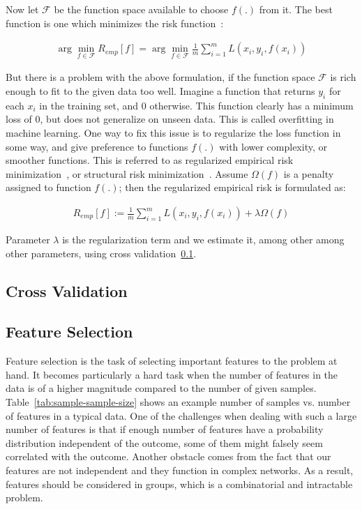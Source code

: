 Now let $\mathcal{F}$ be the function space available to choose $f(.)$ from it. The best function is one which minimizes the risk function~\cite[p. 67]{learning-with-kernels}:

\begin{align}
  \arg \min_{f \in \mathcal{F}} R_{emp}[f] = \arg \min_{f \in \mathcal{F}} \frac{1}{m}\sum_{i = 1}^{m} L(x_i, y_i, f(x_i))
\end{align}

But there is a problem with the above formulation, if the function space $\mathcal{F}$ is rich enough to fit to the given data too well. Imagine a function that returns $y_i$ for each $x_i$ in the training set, and $0$ otherwise. This function clearly has a minimum loss of $0$, but does not generalize on unseen data. This is called overfitting in machine learning. One way to fix this issue is to regularize the loss function in some way, and give preference to functions $f(.)$ with lower complexity, or smoother functions. This is referred to as regularized empirical risk minimization~\cite[Ch. 4.1]{learning-with-kernels}, or structural risk minimization~\cite[Ch. 4.1]{thenatureofstatisticallearningtheory}. Assume $\Omega(f)$ is a penalty assigned to function $f(.)$; then the regularized empirical risk is formulated as:

\begin{align}
  R_{emp}[f] := \frac{1}{m}\sum_{i = 1}^{m} L(x_i, y_i, f(x_i)) + \lambda \Omega(f)
\end{align}

Parameter $\lambda$ is the regularization term and we estimate it, among other among other parameters, using cross validation~\ref{chap:cross-validation}.

\subsection{Cross Validation}
\label{chap:cross-validation}


  
\subsection{Feature Selection}
Feature selection is the task of selecting important features to the problem at hand. It becomes particularly a hard task when the number of features in the data is of a higher magnitude compared to the number of given samples. Table~\ref{tab:sample-sample-size} shows an example number of samples vs. number of features in a typical data. One of the challenges when dealing with such a large number of features is that if enough number of features have a probability distribution independent of the outcome, some of them might falsely seem correlated with the outcome. Another obstacle comes from the fact that our features are not independent and they function in complex networks. As a result, features should be considered in groups, which is a combinatorial and intractable problem.

